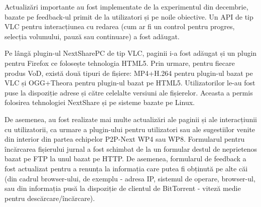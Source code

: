 Actualizări importante au fost implementate de la experimentul din decembrie,
bazate pe feedback-ul primit de la utilizatori și pe noile obiective. Un API de tip
VLC pentru interacțiunea cu redarea (cum ar fi un control pentru progres, selecția
volumului, pauză sau continuare) a fost adăugat.

Pe lângă plugin-ul NextSharePC de tip VLC, paginii i-a fost adăugat și un plugin
pentru Firefox ce folosește tehnologia HTML5. Prin urmare, pentru fiecare
produs VoD, există două tipuri de fișiere: MP4+H.264 pentru plugin-ul bazat pe
VLC și OGG+Theora pentru plugin-ul bazat pe HTML5. Utilizatorilor le-au fost
puse la dispoziție adrese și către celelalte versiuni ale fișierelor. Aceasta
a permis folosirea tehnologiei NextShare și pe sisteme bazate pe Linux.

De asemenea, au fost realizate mai multe actualizări ale paginii și ale
interacțiunii cu utilizatorii, ca urmare a plugin-ului pentru utilizatori sau
ale sugestiilor venite din interior din partea echipelor P2P-Next WP4 sau WP8.
Formularul pentru încărcarea fișierului jurnal a fost schimbat de la un formular
destul de neprietenos bazat pe FTP la unul bazat pe HTTP. De asemenea, formularul
de feedback a fost actualizat pentru a renunța la informația care putea fi obținută
pe alte căi (din cadrul browser-ului, de exemplu - adresa IP, sistemul de operare,
browser-ul, sau din informația pusă la dispoziție de clientul de BitTorrent -
viteză medie pentru descărcare/încărcare).

